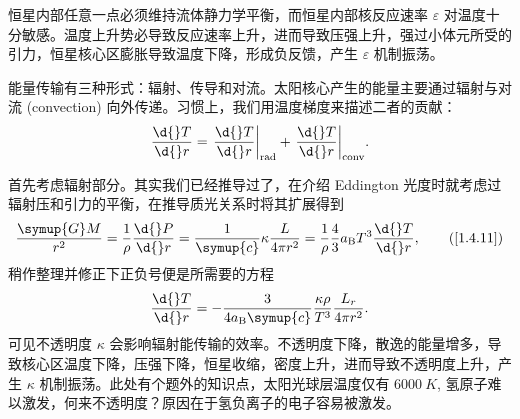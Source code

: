 \documentclass[../天体物理基础.tex]{subfiles}
\begin{document}
恒星内部任意一点必须维持流体静力学平衡，而恒星内部核反应速率 $\varepsilon$ 对温度十分敏感。温度上升势必导致反应速率上升，进而导致压强上升，强过小体元所受的引力，恒星核心区膨胀导致温度下降，形成负反馈，产生 $\varepsilon$ 机制振荡。

能量传输有三种形式：辐射、传导和对流。太阳核心产生的能量主要通过辐射与对流 (convection) 向外传递。习惯上，我们用温度梯度来描述二者的贡献：
\begin{equation}
\frac{\d{}T}{\d{}r}=\mleft.\frac{\d{}T}{\d{}r}\mright\vert_{\mathrm{rad}}+\mleft.\frac{\d{}T}{\d{}r}\mright\vert_{\mathrm{conv}}.
\end{equation}

首先考虑辐射部分。其实我们已经推导过了，在介绍 Eddington 光度时就考虑过辐射压和引力的平衡，在推导质光关系时将其扩展得到
\begin{equation}
\frac{\symup{G}M}{r^{2}}=\frac{1}{\rho}\frac{\d{}P}{\d{}r}=\frac{1}{\symup{c}}\kappa\frac{L}{4\pi r^{2}}=\frac{1}{\rho}\frac{4}{3}a_{\mathrm{B}}T^{3}\frac{\d{}T}{\d{}r},\tag{\ref{1.4.11}}
\end{equation}
稍作整理并修正下正负号便是所需要的方程
\begin{equation}
\frac{\d{}T}{\d{}r}=-\frac{3}{4a_{\mathrm{B}}\symup{c}}\frac{\kappa\rho}{T^{3}}\frac{L_{r}}{4\pi r^{2}}.\label{2.1.68}
\end{equation}
可见不透明度 $\kappa$ 会影响辐射能传输的效率。不透明度下降，散逸的能量增多，导致核心区温度下降，压强下降，恒星收缩，密度上升，进而导致不透明度上升，产生 $\kappa$ 机制振荡。此处有个题外的知识点，太阳光球层温度仅有 $\qty{6000}{K}$, 氢原子难以激发，何来不透明度？原因在于氢负离子的电子容易被激发。
\end{document}
